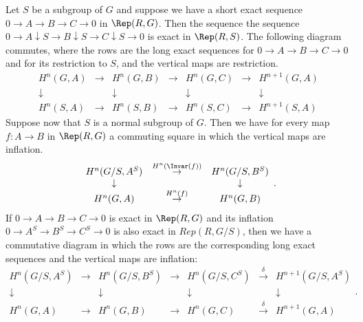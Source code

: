 \begin{lemma} \label{lem:inflation restriction naturality}
	\leanok
	Let $S$ be a subgroup of $G$ and suppose we have a short exact sequence
	$0 \to A \to B \to C \to 0$ in $\Rep(R,G)$.
	Then the sequence the sequence
	$0 \to A \downarrow S \to B \downarrow S \to C \downarrow S \to 0$ is exact
	in $\Rep(R,S)$.
	The following diagram commutes, where the rows are the long exact sequences
	for $0 \to A \to B \to C \to 0$ and for its restriction to $S$,
	and the vertical maps are restriction.
	\[
  	\begin{array}{ccccccc}
			H^n(G,A) & \to & H^n(G,B) &\to &H^n(G,C)& \to& H^{n+1}(G,A)\\
			\downarrow&&\downarrow&&\downarrow&&\downarrow \\
			H^n(S,A) & \to & H^n(S,B) &\to &H^n(S,C)& \to& H^{n+1}(S,A)
		\end{array}
  \]
	Suppose now that $S$ is a normal subgroup of $G$. Then we have for every
	map $f : A \to B$ in $\Rep(R,G)$ a commuting square in which the vertical maps are inflation.
	\[
  	\begin{array}{ccccccc}
			H^n(G/S,A^S) & \stackrel{H^n(\Invar(f))}\to & H^n(G/S,B^S)\\
			\downarrow&&\downarrow \\
			H^n(G,A) & \stackrel{H^n(f)}\to & H^n(G,B)
		\end{array}.
	\]
	If $0 \to A \to B \to C \to 0$ is exact in $\Rep(R,G)$ and its inflation
	$0 \to A^S \to B^S \to C^S \to 0$ is also exact in $Rep(R,G/S)$, then
	we have a commutative diagram in which the rows are the corresponding long exact
	sequences and the vertical maps are inflation:
	\[
  	\begin{array}{ccccccc}
			H^n(G/S,A^S) & \to & H^n(G/S,B^S) &\to &H^n(G/S,C^S)& \stackrel{\delta}\to& H^{n+1}(G/S,A^S)\\
			\downarrow&&\downarrow&&\downarrow&&\downarrow \\
			H^n(G,A) & \to & H^n(G,B) &\to &H^n(G,C)& \stackrel{\delta}\to& H^{n+1}(G,A)
		\end{array}.
  \]
\end{lemma}


